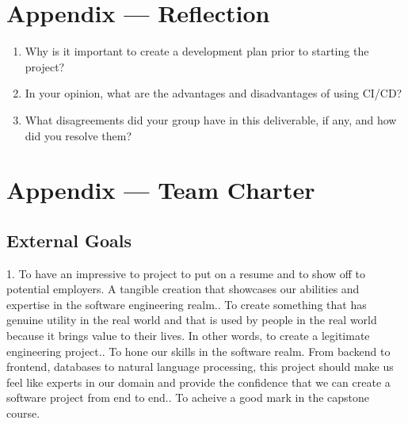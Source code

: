 \documentclass{article}
\begin{document}
\newpage{}

\section*{Appendix --- Reflection}




\begin{enumerate}
    \item Why is it important to create a development plan prior to starting the
    project?
    \item In your opinion, what are the advantages and disadvantages of using
    CI/CD?
    \item What disagreements did your group have in this deliverable, if any,
    and how did you resolve them?
\end{enumerate}

\newpage{}

\section*{Appendix --- Team Charter}


\subsection*{External Goals}


\par{1. To have an impressive to project to put on a resume and to show off to potential employers. A tangible creation that showcases our abilities
and expertise in the software engineering realm.\newline{}. To create something that has genuine utility in the real world and that is used by people in the real world because it brings value to their lives.
In other words, to create a legitimate engineering project.\newline{}. To hone our skills in the software realm. From backend to frontend, databases to natural language processing, this project should make us feel like experts 
in our domain and provide the confidence that we can create a software project from end to end.\newline{}. To acheive a good mark in the capstone course.}
\end{document}

